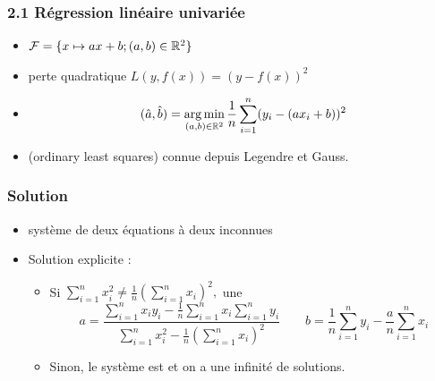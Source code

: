 \begin{frame}
  \frametitle{2.1 Régression linéaire univariée}
  \begin{itemize}
  \item {}  $\mathcal{F} = \{x \mapsto a x + b ; (a, b) \in {\mathbb R}^2\}$ 
    \pause
  \item {} perte quadratique $L(y, f(x)) = (y - f(x))^2$
    \pause
  \item {}
    \[ (\hat{a}, \hat{b}) = \operatorname*{arg\,min}_{(a,b) \in {\mathbb R}^2} \frac1n \sum_{i=1}^n (y_i - (a x_i + b))^2 \]
    \pause
  \item[]  \textcolor{gray!70}{(ordinary least squares)} connue depuis Legendre et Gauss. 
  \end{itemize}
\end{frame}

\begin{frame}
  \frametitle{Solution}
  \begin{itemize}
  \item {} système de deux équations à deux inconnues
  \item[] Solution explicite : 
    \begin{itemize}
    \item Si $\sum_{i=1}^n x_i^2 \neq \frac{1}{n}\left(\sum_{i=1}^n x_i\right)^2,$ une 
      \[ a = \frac{\sum_{i=1}^n x_i y_i - \frac1n \sum_{i=1}^n x_i \sum_{i=1}^n y_i}{
          \sum_{i=1}^n x_i^2 - \frac1n \left(\sum_{i=1}^n x_i\right)^2}  \hspace{2em}
        b = \frac1n \sum_{i=1}^n y_i - \frac{a}{n} \sum_{i=1}^n x_i\]
      \pause
    \item Sinon, le système est  et on a une infinité de solutions.
    \end{itemize}
  \end{itemize}
\end{frame}

